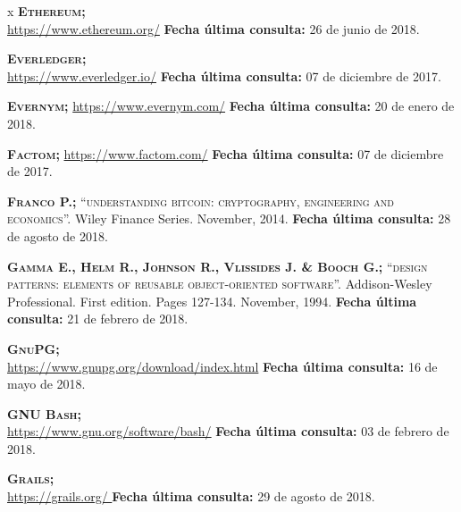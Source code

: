 \begin{thebibliography} {x}
	 \textsc{\textbf{Ethereum; }} \\
	\url{https://www.ethereum.org/}
	\newline \textbf{Fecha última consulta:} 26 de junio de 2018.
	
	 \textsc{\textbf{Everledger; }} \\
	\url{https://www.everledger.io/}
	\newline \textbf{Fecha última consulta:} 07 de diciembre de 2017.
		
	 \textsc{\textbf{Evernym; }} 
	\url{https://www.evernym.com/}
	\newline \textbf{Fecha última consulta:} 20 de enero de 2018.	
	
	 \textsc{\textbf{Factom; }} 
	\url{https://www.factom.com/}
	\newline \textbf{Fecha última consulta:} 07 de diciembre de 2017.
		
	 \textsc{\textbf{Franco P.; }}\textsc{“understanding bitcoin: cryptography, engineering and economics”.} Wiley Finance Series. November, 2014. 
	\newline \textbf{Fecha última consulta:} 28 de agosto de 2018.
		
	 \textsc{\textbf{Gamma E., Helm R., Johnson R., Vlissides J. \& Booch G.; }}\textsc{“design patterns: elements of reusable object-oriented software”.} Addison-Wesley Professional. First edition. Pages 127-134. November, 1994.
	\newline \textbf{Fecha última consulta:} 21 de febrero de 2018.
		
	 \textsc{\textbf{GnuPG; }} \\ 
	\url{https://www.gnupg.org/download/index.html}
	\newline \textbf{Fecha última consulta:} 16 de mayo de 2018.
				
	 \textsc{\textbf{GNU Bash; }} \\ 
	\url{https://www.gnu.org/software/bash/}
	\newline \textbf{Fecha última consulta:} 03 de febrero de 2018.
		
	 \textsc{\textbf{Grails; }} \\ 
	\url{https://grails.org/	}
	\newline \textbf{Fecha última consulta:} 29 de agosto de 2018.
	

\end{thebibliography}
